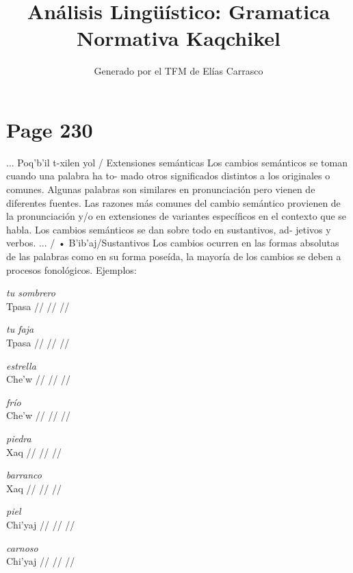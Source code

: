 \documentclass{article}%
\title{Análisis Lingüístico: Gramatica Normativa Kaqchikel}%
\author{Generado por el TFM de Elías Carrasco}%
\begin{document}
%
\normalsize%
\maketitle%
\section{Page 230}%
\label{sec:Page230}%
... Poq'b'il t{-}xilen yol / Extensiones semánticas %
Los cambios semánticos se toman cuando una palabra ha to{-} %
mado otros significados distintos a los originales o comunes. %
Algunas palabras son similares en pronunciación pero vienen %
de diferentes fuentes. %
Las razones más comunes del cambio semántico provienen de %
la pronunciación y/o en extensiones de variantes específicos %
en el contexto que se habla. %
Los cambios semánticos se dan sobre todo en sustantivos, ad{-} %
jetivos y verbos. %
... / • B'ib'aj/Sustantivos %
Los cambios ocurren en las formas absolutas de las palabras %
como en su forma poseída, la mayoría de los cambios se deben %
a procesos fonológicos. %
Ejemplos: %
\par\medskip%
\ex
\textit{tu sombrero} \\
\begingl
\gla Tpasa //
\glb  //
\glc  //
\endgl
\xe
%
\medskip%
\par\medskip%
\ex
\textit{tu faja} \\
\begingl
\gla Tpasa //
\glb  //
\glc  //
\endgl
\xe
%
\medskip%
\par\medskip%
\ex
\textit{estrella} \\
\begingl
\gla Che'w //
\glb  //
\glc  //
\endgl
\xe
%
\medskip%
\par\medskip%
\ex
\textit{frío} \\
\begingl
\gla Che'w //
\glb  //
\glc  //
\endgl
\xe
%
\medskip%
\par\medskip%
\ex
\textit{piedra} \\
\begingl
\gla Xaq //
\glb  //
\glc  //
\endgl
\xe
%
\medskip%
\par\medskip%
\ex
\textit{barranco} \\
\begingl
\gla Xaq //
\glb  //
\glc  //
\endgl
\xe
%
\medskip%
\par\medskip%
\ex
\textit{piel} \\
\begingl
\gla Chi'yaj //
\glb  //
\glc  //
\endgl
\xe
%
\medskip%
\par\medskip%
\ex
\textit{carnoso} \\
\begingl
\gla Chi'yaj //
\glb  //
\glc  //
\endgl
\xe
%

%
\end{document}
